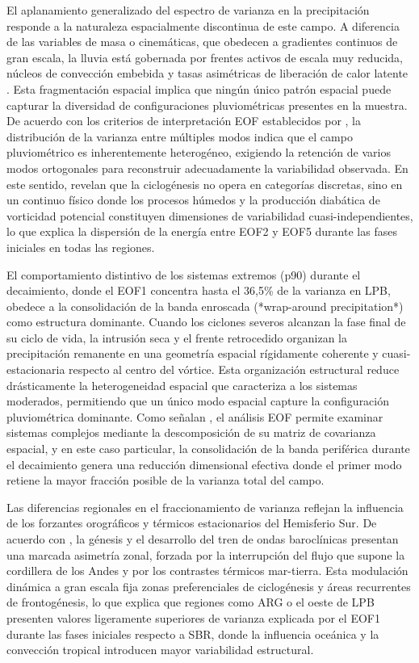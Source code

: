 El aplanamiento generalizado del espectro de varianza en la precipitación responde a la naturaleza espacialmente discontinua de este campo. A diferencia de las variables de masa o cinemáticas, que obedecen a gradientes continuos de gran escala, la lluvia está gobernada por frentes activos de escala muy reducida, núcleos de convección embebida y tasas asimétricas de liberación de calor latente \citep{oertel2021warm}. Esta fragmentación espacial implica que ningún único patrón espacial puede capturar la diversidad de configuraciones pluviométricas presentes en la muestra. De acuerdo con los criterios de interpretación EOF establecidos por \citet{hannachi2007empirical}, la distribución de la varianza entre múltiples modos indica que el campo pluviométrico es inherentemente heterogéneo, exigiendo la retención de varios modos ortogonales para reconstruir adecuadamente la variabilidad observada. En este sentido, \citet{graf2017objective} revelan que la ciclogénesis no opera en categorías discretas, sino en un continuo físico donde los procesos húmedos y la producción diabática de vorticidad potencial constituyen dimensiones de variabilidad cuasi-independientes, lo que explica la dispersión de la energía entre EOF2 y EOF5 durante las fases iniciales en todas las regiones.

El comportamiento distintivo de los sistemas extremos (p90) durante el decaimiento, donde el EOF1 concentra hasta el 36,5\% de la varianza en LPB, obedece a la consolidación de la banda enroscada (*wrap-around precipitation*) como estructura dominante. Cuando los ciclones severos alcanzan la fase final de su ciclo de vida, la intrusión seca y el frente retrocedido organizan la precipitación remanente en una geometría espacial rígidamente coherente y cuasi-estacionaria respecto al centro del vórtice. Esta organización estructural reduce drásticamente la heterogeneidad espacial que caracteriza a los sistemas moderados, permitiendo que un único modo espacial capture la configuración pluviométrica dominante. Como señalan \citet{hannachi2023eof}, el análisis EOF permite examinar sistemas complejos mediante la descomposición de su matriz de covarianza espacial, y en este caso particular, la consolidación de la banda periférica durante el decaimiento genera una reducción dimensional efectiva donde el primer modo retiene la mayor fracción posible de la varianza total del campo.

Las diferencias regionales en el fraccionamiento de varianza reflejan la influencia de los forzantes orográficos y térmicos estacionarios del Hemisferio Sur. De acuerdo con \citet{inatsu2004zonal}, la génesis y el desarrollo del tren de ondas baroclínicas presentan una marcada asimetría zonal, forzada por la interrupción del flujo que supone la cordillera de los Andes y por los contrastes térmicos mar-tierra. Esta modulación dinámica a gran escala fija zonas preferenciales de ciclogénesis y áreas recurrentes de frontogénesis, lo que explica que regiones como ARG o el oeste de LPB presenten valores ligeramente superiores de varianza explicada por el EOF1 durante las fases iniciales respecto a SBR, donde la influencia oceánica y la convección tropical introducen mayor variabilidad estructural.

